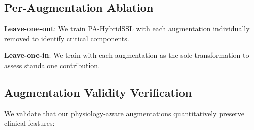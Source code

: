 \documentclass[journal,10pt]{IEEEtran}
\begin{document}
\subsection{Per-Augmentation Ablation}

\textbf{Leave-one-out}: We train PA-HybridSSL with each augmentation individually removed to identify critical components.

\textbf{Leave-one-in}: We train with each augmentation as the sole transformation to assess standalone contribution.

\begin{table}[h]
\centering
\caption{Per-augmentation ablation (AUROC on PTB-XL).}
\label{tab:aug_ablation}
\end{table}

\subsection{Augmentation Validity Verification}

We validate that our physiology-aware augmentations quantitatively preserve clinical features:
\end{document}
